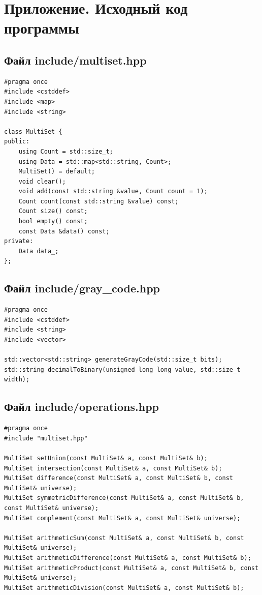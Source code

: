 \documentclass[14pt]{extreport}
\begin{document}
\newpage
{\centering\section*{Приложение. Исходный код программы}}

\subsection*{Файл include/multiset.hpp}
\begin{lstlisting}
#pragma once
#include <cstddef>
#include <map>
#include <string>

class MultiSet {
public:
    using Count = std::size_t;
    using Data = std::map<std::string, Count>;
    MultiSet() = default;
    void clear();
    void add(const std::string &value, Count count = 1);
    Count count(const std::string &value) const;
    Count size() const;
    bool empty() const;
    const Data &data() const;
private:
    Data data_;
};
\end{lstlisting}

\subsection*{Файл include/gray\_code.hpp}
\begin{lstlisting}
#pragma once
#include <cstddef>
#include <string>
#include <vector>

std::vector<std::string> generateGrayCode(std::size_t bits);
std::string decimalToBinary(unsigned long long value, std::size_t width);
\end{lstlisting}

\subsection*{Файл include/operations.hpp}
\begin{lstlisting}
#pragma once
#include "multiset.hpp"

MultiSet setUnion(const MultiSet& a, const MultiSet& b);
MultiSet intersection(const MultiSet& a, const MultiSet& b);
MultiSet difference(const MultiSet& a, const MultiSet& b, const MultiSet& universe);
MultiSet symmetricDifference(const MultiSet& a, const MultiSet& b, const MultiSet& universe);
MultiSet complement(const MultiSet& a, const MultiSet& universe);

MultiSet arithmeticSum(const MultiSet& a, const MultiSet& b, const MultiSet& universe);
MultiSet arithmeticDifference(const MultiSet& a, const MultiSet& b);
MultiSet arithmeticProduct(const MultiSet& a, const MultiSet& b, const MultiSet& universe);
MultiSet arithmeticDivision(const MultiSet& a, const MultiSet& b);
\end{lstlisting}
\end{document}
